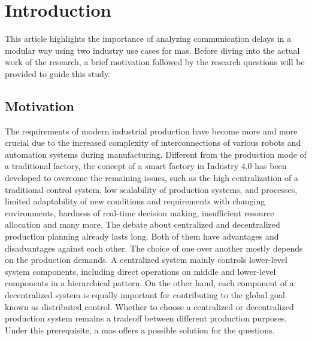 \glsresetall%
\chapter{Introduction}%
This article highlights the importance of analyzing communication 
delays in a modular way using two industry use cases for \gls{mas}.
Before diving into the actual work of the research, 
a brief motivation followed by the research questions will be
provided to guide this study.

\section{Motivation}\label{chap: Motivation}
The requirements of modern industrial production have become more and 
more crucial due to the increased complexity of interconnections of 
various robots and automation systems during manufacturing. Different 
from the production mode of a traditional factory, the concept of a 
smart factory in Industry 4.0 has been developed to overcome the 
remaining issues, such as the high centralization of a traditional 
control system, low scalability of production systems, and processes, 
limited adaptability of new conditions and requirements with changing 
environments, hardness of real-time decision making, insufficient resource 
allocation and many more. The debate about centralized and decentralized 
production planning already lasts long\cite{eloranta2014designing}. 
Both of them have advantages and disadvantages against 
each other. The choice of one over another mostly depends on the 
production demands. A centralized system mainly controls lower-level system components, including  
direct operations on middle and lower-level components in a hierarchical 
pattern. On the other hand, each component of a decentralized system 
is equally 
important for contributing to the global goal known as distributed 
control. Whether to choose a centralized or decentralized production system 
remains a tradeoff between different production purposes. 
Under this prerequisite, a \gls{mas} offers a possible solution for the 
questions. 


